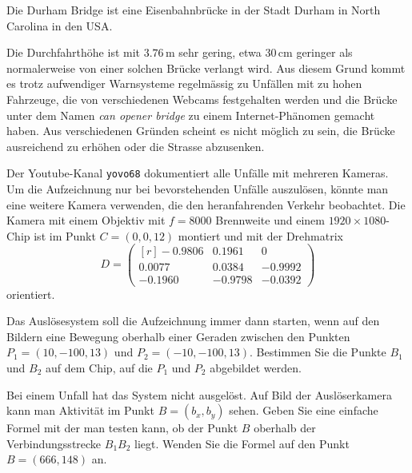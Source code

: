 Die Durham Bridge ist eine Eisenbahnbrücke in der Stadt Durham
in North Carolina in den USA.
\begin{center}
\end{center}
Die Durchfahrthöhe ist mit $3.76\,\text{m}$ sehr gering, etwa $30\,\text{cm}$
geringer als normalerweise von einer solchen Brücke verlangt wird.
Aus diesem Grund kommt es trotz aufwendiger Warnsysteme
regelmässig zu Unfällen mit zu hohen Fahrzeuge, die von verschiedenen
Webcams festgehalten werden und die Brücke unter dem Namen
{\em can opener bridge} zu einem Internet-Phänomen gemacht haben.
Aus verschiedenen Gründen scheint es nicht möglich zu sein, die Brücke
ausreichend zu erhöhen oder die Strasse abzusenken.

Der Youtube-Kanal \texttt{yovo68} dokumentiert alle Unfälle mit mehreren
Kameras.
Um die Aufzeichnung nur bei bevorstehenden Unfälle auszulösen,
könnte man eine weitere Kamera verwenden, die den heranfahrenden
Verkehr beobachtet.
Die Kamera mit einem Objektiv mit $f=8000$ Brennweite und einem
$1920\times 1080$-Chip ist im Punkt $C=(0,0,12)$ montiert und mit der
Drehmatrix
\[
D=\begin{pmatrix*}[r]
  -0.9806&  0.1961&  0\phantom{.0000}\\
   0.0077&  0.0384& -0.9992\\
  -0.1960& -0.9798& -0.0392
\end{pmatrix*}
\]
orientiert.

\begin{teilaufgaben}
\item
Das Auslösesystem soll die Aufzeichnung immer dann starten, wenn auf den
Bildern eine Bewegung oberhalb einer Geraden zwischen den Punkten
$P_1=(10,-100,13)$ und $P_2=(-10,-100,13)$.
Bestimmen Sie die Punkte $B_1$ und $B_2$ auf dem Chip, auf die $P_1$ und
$P_2$ abgebildet werden.
\item
Bei einem Unfall hat das System nicht ausgelöst. 
Auf Bild der Auslöserkamera kann man Aktivität im Punkt
$B=(b_x,b_y)$ sehen.
Geben Sie eine einfache Formel mit der man testen kann, ob der
Punkt $B$ oberhalb der Verbindungsstrecke $B_1B_2$ liegt.
Wenden Sie die Formel auf den Punkt $B=(666,148)$ an.
\end{teilaufgaben}

